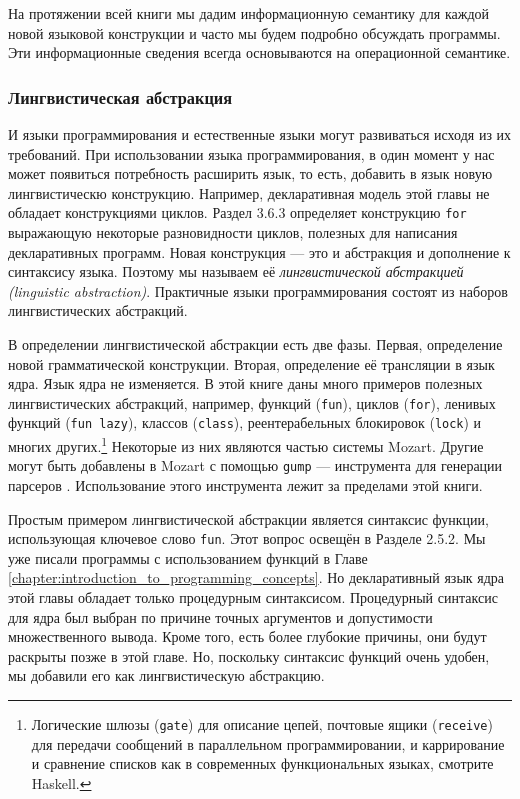 На протяжении всей книги мы дадим информационную семантику для каждой новой языковой конструкции и часто мы будем подробно обсуждать программы. Эти информационные сведения всегда основываются на операционной семантике.

\subsubsection{Лингвистическая абстракция}

И языки программирования и естественные языки могут развиваться исходя из их требований. При использовании языка программирования, в один момент у нас может появиться потребность расширить язык, то есть, добавить в язык новую лингвистическю конструкцию. Например, декларативная модель этой главы не обладает конструкциями циклов. Раздел 3.6.3 определяет конструкцию \lstinline|for| выражающую некоторые разновидности циклов, полезных для написания декларативных программ. Новая конструкция --- это и абстракция и дополнение к синтаксису языка. Поэтому мы называем её \emph{лингвистической абстракцией (linguistic abstraction)}. Практичные языки программирования состоят из наборов лингвистических абстракций.

В определении лингвистической абстракции есть две фазы. Первая, определение новой грамматической конструкции. Вторая, определение её трансляции в язык ядра. Язык ядра не изменяется. В этой книге даны много примеров полезных лингвистических абстракций, например, функций (\lstinline|fun|), циклов (\lstinline|for|), ленивых функций (\lstinline|fun lazy|), классов (\lstinline|class|), реентерабельных блокировок (\lstinline|lock|) и многих других.\footnote{Логические шлюзы (\lstinline|gate|) для описание цепей, почтовые ящики (\lstinline|receive|) для передачи сообщений в параллельном программировании, и каррирование и сравнение списков как в современных функциональных языках, смотрите Haskell.} Некоторые из них являются частью системы Mozart. Другие могут быть добавлены в Mozart с помощью \lstinline|gump| --- инструмента для генерации парсеров \cite{104}. Использование этого инструмента лежит за пределами этой книги.

Простым примером лингвистической абстракции является синтаксис функции, использующая ключевое слово \lstinline|fun|. Этот вопрос освещён в Разделе 2.5.2. Мы уже писали программы с использованием функций в Главе \ref{chapter:introduction_to_programming_concepts}. Но декларативный язык ядра этой главы обладает только процедурным синтаксисом. Процедурный синтаксис для ядра был выбран по причине точных аргументов и допустимости множественного вывода. Кроме того, есть более глубокие причины, они будут раскрыты позже в этой главе. Но, поскольку синтаксис функций очень удобен, мы добавили его как лингвистическую абстракцию.

